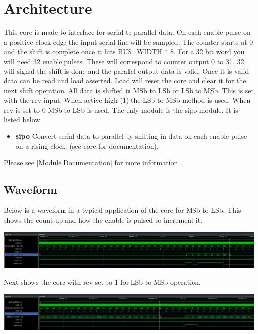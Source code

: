 \section{Architecture}
\par
This core is made to interface for serial to parallel data. On each enable pulse on a positive clock edge the input serial
line will be sampled. The counter starts at 0 and the shift is complete once it hits BUS\_WIDTH * 8. For a 32 bit word you will
need 32 enable pulses. These will correspond to counter output 0 to 31. 32 will signal the shift is done and the parallel output
data is valid. Once it is valid data can be read and load asserted. Load will reset the core and clear it for the next shift operation.
All data is shifted in MSb to LSb or LSb to MSb. This is set with the rev input. When active high (1) the LSb to MSb method is used. When
rev is set to 0 MSb to LSb is used.
The only module is the sipo module. It is listed below.

\begin{itemize}
  \item \textbf{sipo} Convert serial data to parallel by shifting in data on each enable pulse on a rising clock. (see core for documentation).
\end{itemize}

Please see \ref{Module Documentation} for more information.

\subsection{Waveform}
\par
Below is a waveform in a typical application of the core for MSb to LSb. This shows the count up and how the enable is pulsed to increment it.

\includegraphics[width=\textwidth]{img/diagrams/waveform_rev0.png}

\par
Next shows the core with rev set to 1 for LSb to MSb operation.

\includegraphics[width=\textwidth]{img/diagrams/waveform_rev1.png}


